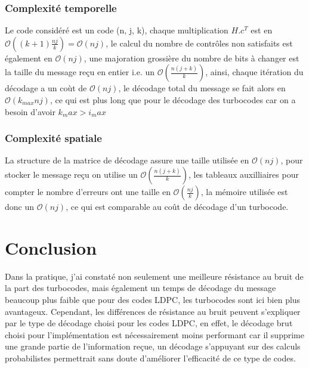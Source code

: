 \documentclass[12pt]{article}
\begin{document}
\subsubsection{Complexit\'e temporelle}
Le code consid\'er\'e est un code (n, j, k), chaque multiplication $H.c^T$ est en $\mathcal{O}((k+1)\frac{nj}{k})=\mathcal{O}(nj)$, le calcul du nombre de contr\^oles non satisfaits est \'egalement en $\mathcal{O}(nj)$, une majoration grossi\`ere du nombre de bits \`a changer est la taille du message re\c{c}u en entier i.e. un $\mathcal{O}(\frac{n(j+k)}{k})$, ainsi, chaque it\'eration du d\'ecodage a un co\`ut de $\mathcal{O}(nj)$, le d\'ecodage total du message se fait alors en $\mathcal{O}(k_{max}nj)$, ce qui est plus long que pour le d\'ecodage des turbocodes car on a besoin d'avoir $k_max > i_max$


\subsubsection{Complexit\'e spatiale}
La structure de la matrice de d\'ecodage assure une taille utilis\'ee en $\mathcal{O}(nj)$, pour stocker le message re\c{c}u on utilise un $\mathcal{O}(\frac{n(j+k)}{k})$, les tableaux auxilliaires pour compter le nombre d'erreurs ont une taille en $\mathcal{O}(\frac{nj}{k})$, la m\'emoire utilis\'ee est donc un $\mathcal{O}(nj)$, ce qui est comparable au co\^ut de d\'ecodage d'un turbocode.


\section{Conclusion}
Dans la pratique, j'ai constat\'e non seulement une meilleure r\'esistance au bruit de la part des turbocodes, mais \'egalement un temps de d\'ecodage du message beaucoup plus faible que pour des codes LDPC, les turbocodes sont ici bien plus avantageux. Cependant, les diff\'erences de r\'esistance au bruit peuvent s'expliquer par le type de d\'ecodage choisi pour les codes LDPC, en effet, le d\'ecodage brut choisi pour l'impl\'ementation est n\'ecessairement moins performant car il supprime une grande partie de l'information re\c{c}ue, un d\'ecodage s'appuyant sur des calculs probabilistes permettrait sans doute d'am\'eliorer l'efficacit\'e de ce type de codes.


\appendix
\end{document}
